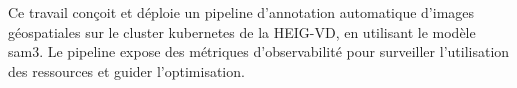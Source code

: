 Ce travail conçoit et déploie un pipeline d'annotation automatique d'images géospatiales
sur le cluster \gls{kubernetes} de la HEIG-VD, en utilisant le modèle \gls{sam3}.
Le pipeline expose des métriques d'observabilité pour surveiller l'utilisation
des ressources et guider l'optimisation.

\asterism

